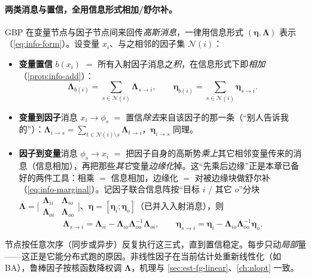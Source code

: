 \paragraph{两类消息与置信，全用信息形式相加/舒尔补。}
GBP 在变量节点与因子节点间来回传\emph{高斯消息}，一律用信息形式 $(\boldsymbol{\eta},\boldsymbol{\Lambda})$ 表示（\cref{eq:info-form}）。设变量 $x_i$、与之相邻的因子集 $\mathcal{N}(i)$：
\begin{itemize}
  \item \textbf{变量置信} $b(x_i)$ $=$ 所有入射因子消息之\emph{积}，在信息形式下即\emph{相加}（\cref{prop:info-add}）：
  \begin{equation}
    \boldsymbol{\Lambda}_{b(i)}=\sum_{s\in\mathcal{N}(i)}\boldsymbol{\Lambda}_{s\to i},\qquad
    \boldsymbol{\eta}_{b(i)}=\sum_{s\in\mathcal{N}(i)}\boldsymbol{\eta}_{s\to i}.
    \label{eq:gbp-belief}
  \end{equation}
  \item \textbf{变量到因子}消息 $x_i\to\phi_s$ $=$ 置信\emph{除去}来自该因子的那一条（“别人告诉我的”）：$\boldsymbol{\Lambda}_{i\to s}=\sum_{t\in\mathcal{N}(i)\setminus s}\boldsymbol{\Lambda}_{t\to i}$，$\boldsymbol{\eta}_{i\to s}$ 同理。
  \item \textbf{因子到变量}消息 $\phi_s\to x_i$ $=$ 把因子自身的高斯势\emph{乘上}其它相邻变量传来的消息（信息相加），再把那些\emph{其它}变量\emph{边缘化}掉。这“先乘后边缘”正是本章已备好的两件工具：相乘 $=$ 信息相加，边缘化 $=$ 对被边缘块做舒尔补（\cref{eq:info-marginal}）。记因子联合信息阵按“目标 $i$ / 其它 $o$”分块 $\boldsymbol{\Lambda}=\big[\begin{smallmatrix}\boldsymbol{\Lambda}_{ii}&\boldsymbol{\Lambda}_{io}\\\boldsymbol{\Lambda}_{oi}&\boldsymbol{\Lambda}_{oo}\end{smallmatrix}\big]$、$\boldsymbol{\eta}=[\boldsymbol{\eta}_i;\boldsymbol{\eta}_o]$（已并入入射消息），则
  \begin{equation}
    \boldsymbol{\Lambda}_{s\to i}=\boldsymbol{\Lambda}_{ii}-\boldsymbol{\Lambda}_{io}\boldsymbol{\Lambda}_{oo}^{-1}\boldsymbol{\Lambda}_{oi},\qquad
    \boldsymbol{\eta}_{s\to i}=\boldsymbol{\eta}_i-\boldsymbol{\Lambda}_{io}\boldsymbol{\Lambda}_{oo}^{-1}\boldsymbol{\eta}_o.
    \label{eq:gbp-factor-msg}
  \end{equation}
\end{itemize}
节点按任意次序（同步或异步）反复执行这三式，直到置信稳定。每步只动\emph{局部}量——这正是它能分布式跑的原因。非线性因子在当前估计处重新线性化（如 BA），鲁棒因子按核函数降权调 $\boldsymbol{\Lambda}$\cite{davison2019futuremapping2}，机理与 \cref{sec:est-fg-linear}、\cref{ch:nlopt} 一致。

